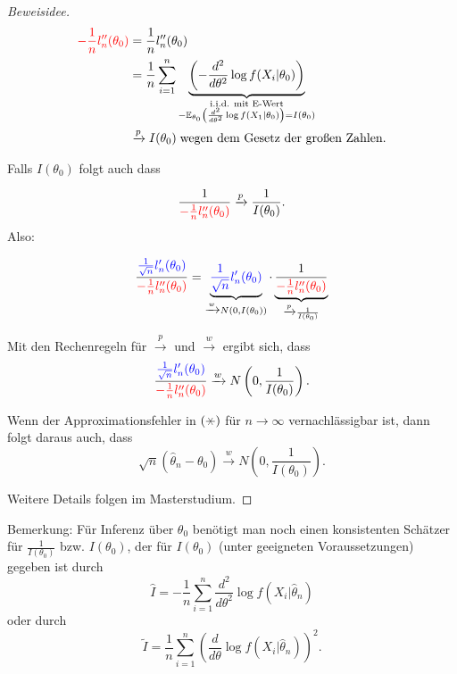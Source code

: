 \documentclass{tstextbook}
\begin{document}
\begin{proof}[Beweisidee]
		\[
		\begin{aligned}
			\textcolor{red}{-\frac{1}{n}l_n^{\prime\prime}(\theta_0)} & = \frac{1}{n} l_n^{\prime \prime} (\theta_0) \\
			& = \frac{1}{n}\sum_{i=1}^{n}\underbrace{\left(-\frac{d^2}{d\theta^2}\log f(X_i|\theta_0)\right)}_{\substack{\text{i.i.d. mit E-Wert} \\ -\mathbb E_{\theta_0}\left(\frac{d^2}{d\theta^2}\log f(X_1|\theta_0)\right)= I(\theta_0)}} \\
			& \xrightarrow{p} I(\theta_0) \; \text{wegen dem Gesetz der großen Zahlen.}
		\end{aligned}
		\]
		
		Falls \(I(\theta_0)\) folgt auch dass
		
		\[
		    \frac{1}{\textcolor{red}{-\frac{1}{n}l_n^{\prime\prime}(\theta_0)}} \xrightarrow{p} \frac{1}{I(\theta_0)}.
		\]
		Also:
		
		\[
		    \frac{\textcolor{blue}{\frac{1}{\sqrt{n}}l_n^\prime(\theta_0)}}{\textcolor{red}{-\frac{1}{n}l_n^{\prime\prime}(\theta_0)}} = \underbrace{\textcolor{blue}{\frac{1}{\sqrt{n}}l_n^\prime(\theta_0)}}_{\xrightarrow{w} N(0,I(\theta_0))} \cdot \underbrace{\frac{1}{\textcolor{red}{-\frac{1}{n}l_n^{\prime\prime}(\theta_0)}}}_{\xrightarrow{p} \frac{1}{I(\theta_0)}}
		\]
		
		Mit den Rechenregeln für $ \xrightarrow{p} $ und $ \xrightarrow{w} $ ergibt sich, dass
		\[
		\frac{\textcolor{blue}{\frac{1}{\sqrt{n}}l_n^\prime(\theta_0)}}{\textcolor{red}{-\frac{1}{n}l_n^{\prime\prime}(\theta_0)}} \xrightarrow{w} N\left(0,\frac{1}{I(\theta_0)}\right).
		\]
		
		Wenn der Approximationsfehler in $ (\hexstar) $ für $ n\to\infty $ vernachlässigbar ist, dann folgt daraus auch, dass 
		\[
		\sqrt{n}(\hat{\theta}_n-\theta_0) \xrightarrow{w} N\left(0,\frac{1}{I(\theta_0)}\right).
		\]
		
		Weitere Details folgen im Masterstudium.
		
	\end{proof}
	
	\begin{remark}
		Bemerkung: Für Inferenz über $\theta_0$ benötigt man noch einen konsistenten Schätzer für $\frac{1}{I(\theta_0)}$ bzw. $I(\theta_0)$, der für $ I(\theta_0) $ (unter geeigneten Voraussetzungen) gegeben ist durch 
		\[
		\hat{I} = -\frac{1}{n}\sum_{i=1}^{n}\frac{d^2}{d\theta^2}\log f(X_i|\hat{\theta}_n)
		\] oder durch
		\[
		\tilde{I} = \frac{1}{n}\sum_{i=1}^{n}\left(\frac{d}{d\theta}\log f(X_i|\hat{\theta}_n)\right)^2.
		\]
	\end{remark}
\end{document}
